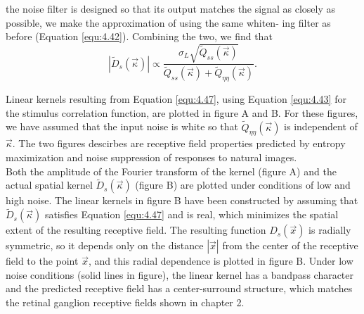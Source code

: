 \begin{thm}
  the noise filter is designed so that its output matches the signal as
closely as possible, we make the approximation of using the same whiten-
ing filter as before (Equation \ref{equ:4.42}). Combining the two, we
find that
\begin{equation}
  \label{equ:4.47}
  \left| \tilde{D}_{s}(\vec{\kappa}) \right| \propto \frac{\sigma_{L}\sqrt{\tilde{Q}_{ss}(\vec{\kappa})}}{\tilde{Q}_{ss}(\vec{\kappa}) + \tilde{Q}_{\eta\eta}(\vec{\kappa})}.
\end{equation}
\end{thm}

\begin{exm}
  Linear kernels resulting from Equation \ref{equ:4.47}, using Equation \ref{equ:4.43} for the
stimulus correlation function, are plotted in figure A and B. For these figures,
we have assumed that the input noise is white so that
$\tilde{Q}_{\eta\eta}(\vec{\kappa})$ is independent of
$\vec{\kappa}$. The two figures descirbes are receptive field properties predicted by entropy maximization and noise
suppression of responses to natural images.\\

Both the amplitude of the Fourier transform of the
kernel (figure A) and the actual spatial kernel
$\tilde{D}_{s}(\vec{\kappa})$ (figure B) are plotted under conditions of low and high noise. The linear kernels in figure B  have been
constructed by assuming that $\tilde{D}_{s}(\vec{\kappa})$ satisfies Equation \ref{equ:4.47} and is real, which
minimizes the spatial extent of the resulting receptive field. The resulting
function $D_s(\vec{x})$ is radially symmetric, so it depends only on
the distance $\left| \vec{x} \right|$ from the center of the receptive field to the
point $\vec{x}$, and this radial dependence is plotted in figure
B. Under low noise conditions (solid lines in figure), the linear kernel has a bandpass character and the predicted
receptive field has a center-surround structure, which matches the retinal
ganglion receptive fields shown in chapter 2.\\


\end{exm}
